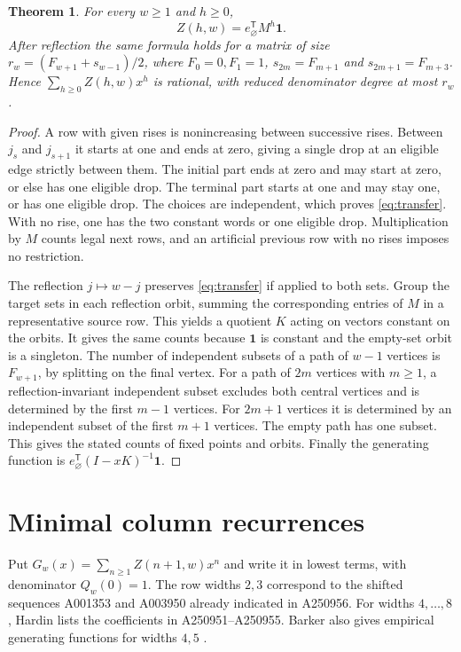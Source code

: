 \documentclass[11pt]{article}
\newtheorem{theorem}{Theorem}
\begin{document}
\begin{theorem}
For every $w\ge1$ and $h\ge0$,
\[
 Z(h,w)=e_{\varnothing}^{\mathsf T}M^h\mathbf1.
\]
After reflection the same formula holds for a matrix of size $r_w=(F_{w+1}+s_{w-1})/2$, where $F_0=0,F_1=1$, $s_{2m}=F_{m+1}$ and $s_{2m+1}=F_{m+3}$. Hence $\sum_{h\ge0}Z(h,w)x^h$ is rational, with reduced denominator degree at most $r_w$.
\end{theorem}
\begin{proof}
A row with given rises is nonincreasing between successive rises. Between $j_s$ and $j_{s+1}$ it starts at one and ends at zero, giving a single drop at an eligible edge strictly between them. The initial part ends at zero and may start at zero, or else has one eligible drop. The terminal part starts at one and may stay one, or has one eligible drop. The choices are independent, which proves \eqref{eq:transfer}. With no rise, one has the two constant words or one eligible drop. Multiplication by $M$ counts legal next rows, and an artificial previous row with no rises imposes no restriction.

The reflection $j\mapsto w-j$ preserves \eqref{eq:transfer} if applied to both sets. Group the target sets in each reflection orbit, summing the corresponding entries of $M$ in a representative source row. This yields a quotient $K$ acting on vectors constant on the orbits. It gives the same counts because $\mathbf1$ is constant and the empty-set orbit is a singleton. The number of independent subsets of a path of $w-1$ vertices is $F_{w+1}$, by splitting on the final vertex. For a path of $2m$ vertices with $m\ge1$, a reflection-invariant independent subset excludes both central vertices and is determined by the first $m-1$ vertices. For $2m+1$ vertices it is determined by an independent subset of the first $m+1$ vertices. The empty path has one subset. This gives the stated counts of fixed points and orbits. Finally the generating function is $e_{\varnothing}^{\mathsf T}(I-xK)^{-1}\mathbf1$.
\end{proof}

\section{Minimal column recurrences}
Put $G_w(x)=\sum_{n\ge1}Z(n+1,w)x^n$ and write it in lowest terms, with denominator $Q_w(0)=1$. The row widths $2,3$ correspond to the shifted sequences A001353 and A003950 already indicated in A250956. For widths $4,\ldots,8$, Hardin lists the coefficients in A250951--A250955. Barker also gives empirical generating functions for widths $4,5$ \cite{columns}.
\end{document}
